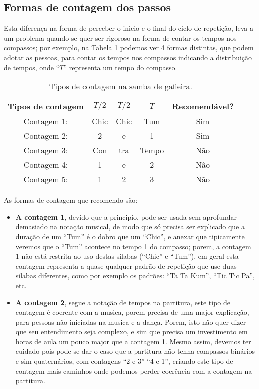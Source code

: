 \subsection{Formas de contagem dos passos}
Esta diferença na forma de perceber o inicio e o final do ciclo de repetição, 
leva a um problema quando se quer ser rigoroso na forma de contar os tempos nos compassos; 
por exemplo, na Tabela \ref{tab:ritmo1} 
podemos ver 4 formas distintas, que podem adotar as pessoas, 
para contar os tempos nos compassos indicando a distribuição de tempos, 
onde ``$T$'' representa um tempo do compasso.
\begin{table}[ht]
  \centering
  \begin{tabular}    {c|ccc|c}
    \hline
    Tipos de contagem       & $T/2$ & $T/2$   & $T$ & Recomendável?\\
    \hline
    Contagem 1: & Chic  & Chic  & Tum   & Sim\\
    Contagem 2: & 2     & e     & 1     & Sim\\ \hline
    Contagem 3: & Con   & tra  & Tempo & Não\\
    Contagem 4: & 1     & e     & 2     & Não\\
    Contagem 5: & 1     & 2     & 3     & Não\\
    \hline
  \end{tabular}
  \caption{Tipos de contagem na samba de gafieira.}
\label{tab:ritmo1}
\end{table}

As formas de contagem que recomendo são:
\begin{itemize}
\item \textbf{A contagem 1}, 
devido que a principio, pode ser usada sem aprofundar demasiado 
na notação musical, de modo que só precisa ser explicado que a duração de um 
``Tum'' é o dobro que um ``Chic'', e anexar que tipicamente veremos que o ``Tum''
acontece no tempo 1 do compasso; 
porem, a contagem 1 não está restrita ao uso destas silabas (``Chic'' e ``Tum''), 
em geral esta contagem representa a quase qualquer padrão de repetição
que use duas silabas diferentes, como por exemplo os padrões: ``Ta Ta Kum'', ``Tic Tic Pa'', etc. 
\item \textbf{A contagem 2}, segue a notação de tempos na partitura, este tipo de
contagem é coerente com a musica, porem precisa de uma major explicação, 
para pessoas não iniciadas na musica e a dança. Porem, isto não quer dizer que seu
entendimento seja complexo, e sim que precisa um investimento em horas de aula
um pouco major que a contagem 1.
Mesmo assim, devemos ter cuidado pois pode-se dar o caso que a partitura não tenha compassos binários 
e sim quaternários, com contagens ``2 e 3'' ``4 e 1'', 
criando este tipo de contagem mais caminhos onde podemos perder coerência com a contagem na partitura.
\end{itemize}

